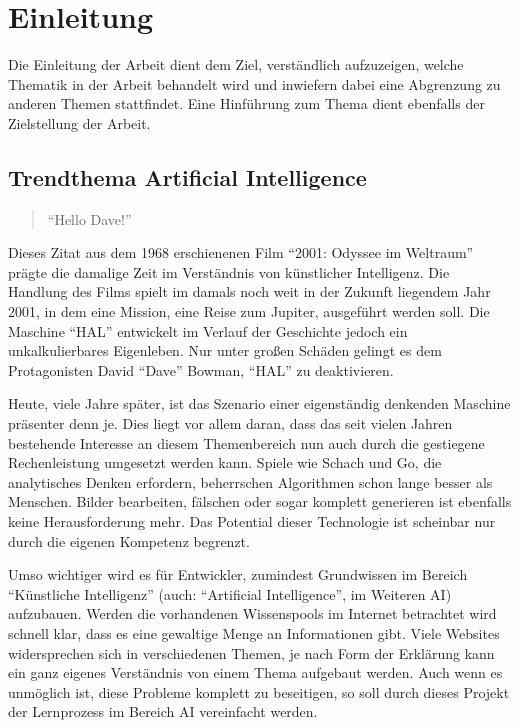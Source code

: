 \chapter{Einleitung}

Die Einleitung der Arbeit dient dem Ziel, verständlich aufzuzeigen, welche Thematik in der Arbeit behandelt wird und inwiefern dabei eine Abgrenzung zu anderen Themen stattfindet. Eine Hinführung zum Thema dient ebenfalls der Zielstellung der Arbeit.

\section{Trendthema Artificial Intelligence}

\begin{quote}
"`Hello Dave!"'
\end{quote}

Dieses Zitat aus dem 1968 erschienenen Film "`2001: Odyssee im Weltraum"' prägte die damalige Zeit im Verständnis von künstlicher Intelligenz. Die Handlung des Films spielt im damals noch weit in der Zukunft liegendem Jahr 2001, in dem eine Mission, eine Reise zum Jupiter, ausgeführt werden soll. Die Maschine "`HAL"' entwickelt im Verlauf der Geschichte jedoch ein unkalkulierbares Eigenleben. Nur unter großen Schäden gelingt es dem Protagonisten David "`Dave"' Bowman, "`HAL"' zu deaktivieren.

Heute, viele Jahre später, ist das Szenario einer eigenständig denkenden Maschine präsenter denn je. Dies liegt vor allem daran, dass das seit vielen Jahren bestehende Interesse an diesem Themenbereich nun auch durch die gestiegene Rechenleistung umgesetzt werden kann. Spiele wie Schach und Go, die analytisches Denken erfordern, beherrschen Algorithmen schon lange besser als Menschen. Bilder bearbeiten, fälschen oder sogar komplett generieren ist ebenfalls keine Herausforderung mehr. Das Potential dieser Technologie ist scheinbar nur durch die eigenen Kompetenz begrenzt. \cite{M_AlphaGo_1.1} 

Umso wichtiger wird es für Entwickler, zumindest Grundwissen im Bereich "`Künstliche Intelligenz"' (auch: "`Artificial Intelligence"', im Weiteren AI) aufzubauen. Werden die vorhandenen Wissenspools im Internet betrachtet wird schnell klar, dass es eine gewaltige Menge an Informationen gibt. Viele Websites widersprechen sich in verschiedenen Themen, je nach Form der Erklärung kann ein ganz eigenes Verständnis von einem Thema aufgebaut werden. Auch wenn es unmöglich ist, diese Probleme komplett zu beseitigen, so soll durch dieses Projekt der Lernprozess im Bereich AI vereinfacht werden.

